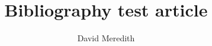 \documentclass[11pt]{amsart}
\title{Bibliography test article}
\author{David Meredith}
\begin{document}
\maketitle

\citep{ChaterVitanyi2003}
\citep{ChaterVitanyi2003b}



\end{document}
